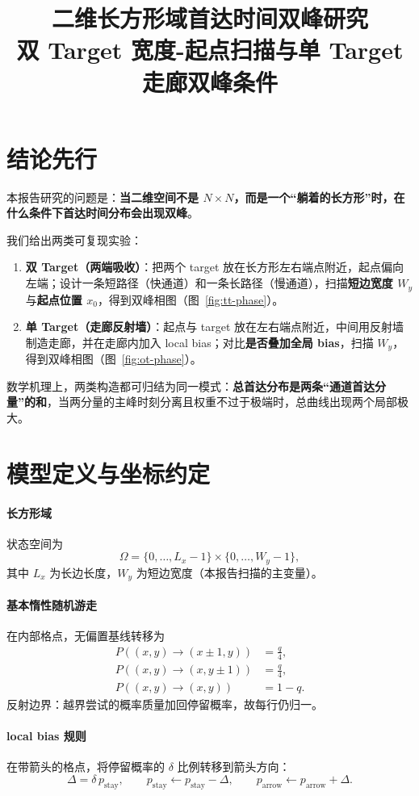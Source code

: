 \documentclass[11pt,fontset=fandol]{ctexart}
\title{二维长方形域首达时间双峰研究\\\large 双 Target 宽度-起点扫描与单 Target 走廊双峰条件}
\author{}
\date{}
\begin{document}
\maketitle

\section*{结论先行}
本报告研究的问题是：\textbf{当二维空间不是 $N\times N$，而是一个“躺着的长方形”时，在什么条件下首达时间分布会出现双峰}。

我们给出两类可复现实验：
\begin{enumerate}
  \item \textbf{双 Target（两端吸收）}：把两个 target 放在长方形左右端点附近，起点偏向左端；设计一条短路径（快通道）和一条长路径（慢通道），扫描\textbf{短边宽度 $W_y$}与\textbf{起点位置 $x_0$}，得到双峰相图（图~\ref{fig:tt-phase}）。
  \item \textbf{单 Target（走廊反射墙）}：起点与 target 放在左右端点附近，中间用反射墙制造走廊，并在走廊内加入 local bias；对比\textbf{是否叠加全局 bias}，扫描 $W_y$，得到双峰相图（图~\ref{fig:ot-phase}）。
\end{enumerate}

数学机理上，两类构造都可归结为同一模式：\textbf{总首达分布是两条“通道首达分量”的和}，当两分量的主峰时刻分离且权重不过于极端时，总曲线出现两个局部极大。

\section{模型定义与坐标约定}
\paragraph{长方形域}
状态空间为
\[
\Omega=\{0,\dots,L_x-1\}\times\{0,\dots,W_y-1\},
\]
其中 $L_x$ 为长边长度，$W_y$ 为短边宽度（本报告扫描的主变量）。

\paragraph{基本惰性随机游走}
在内部格点，无偏置基线转移为
\begin{align}
P((x,y)\to(x\pm1,y))&=\frac{q}{4},\\
P((x,y)\to(x,y\pm1))&=\frac{q}{4},\\
P((x,y)\to(x,y))&=1-q.
\end{align}
反射边界：越界尝试的概率质量加回停留概率，故每行仍归一。

\paragraph{local bias 规则}
在带箭头的格点，将停留概率的 $\delta$ 比例转移到箭头方向：
\[
\Delta=\delta\,p_{\mathrm{stay}},\qquad
p_{\mathrm{stay}}\leftarrow p_{\mathrm{stay}}-\Delta,\qquad
p_{\mathrm{arrow}}\leftarrow p_{\mathrm{arrow}}+\Delta.
\]
\end{document}
